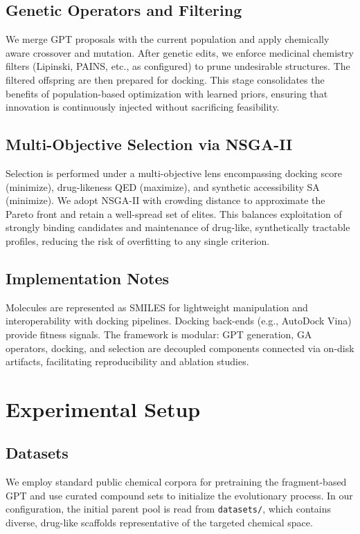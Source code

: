 \documentclass[letterpaper,journal]{IEEEtran}
\begin{document}
\subsection{Genetic Operators and Filtering}
We merge GPT proposals with the current population and apply chemically aware crossover and mutation. After genetic edits, we enforce medicinal chemistry filters (Lipinski, PAINS, etc., as configured) to prune undesirable structures. The filtered offspring are then prepared for docking. This stage consolidates the benefits of population-based optimization with learned priors, ensuring that innovation is continuously injected without sacrificing feasibility.

\subsection{Multi-Objective Selection via NSGA-II}
Selection is performed under a multi-objective lens encompassing docking score (minimize), drug-likeness QED (maximize), and synthetic accessibility SA (minimize). We adopt NSGA-II with crowding distance to approximate the Pareto front and retain a well-spread set of elites. This balances exploitation of strongly binding candidates and maintenance of drug-like, synthetically tractable profiles, reducing the risk of overfitting to any single criterion.

\subsection{Implementation Notes}
Molecules are represented as SMILES for lightweight manipulation and interoperability with docking pipelines. Docking back-ends (e.g., AutoDock Vina) provide fitness signals. The framework is modular: GPT generation, GA operators, docking, and selection are decoupled components connected via on-disk artifacts, facilitating reproducibility and ablation studies.


\section{Experimental Setup}
\subsection{Datasets}
We employ standard public chemical corpora for pretraining the fragment-based GPT and use curated compound sets to initialize the evolutionary process. In our configuration, the initial parent pool is read from \texttt{datasets/}, which contains diverse, drug-like scaffolds representative of the targeted chemical space.
\end{document}
